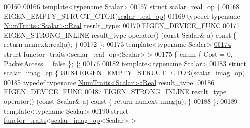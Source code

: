 \begin{DoxyCode}
00160 
00166 \textcolor{keyword}{template}<\textcolor{keyword}{typename} Scalar>
\hyperlink{struct_eigen_1_1internal_1_1scalar__real__op}{00167} \textcolor{keyword}{struct }\hyperlink{struct_eigen_1_1internal_1_1scalar__real__op}{scalar\_real\_op} \{
00168   EIGEN\_EMPTY\_STRUCT\_CTOR(\hyperlink{struct_eigen_1_1internal_1_1scalar__real__op}{scalar\_real\_op})
00169   \textcolor{keyword}{typedef} \textcolor{keyword}{typename} \hyperlink{group___core___module_struct_eigen_1_1_num_traits}{NumTraits<Scalar>::Real} result\_type;
00170   EIGEN\_DEVICE\_FUNC
00171   EIGEN\_STRONG\_INLINE result\_type operator() (\textcolor{keyword}{const} Scalar& a)\textcolor{keyword}{ const }\{ \textcolor{keywordflow}{return} numext::real(a); \}
00172 \};
00173 \textcolor{keyword}{template}<\textcolor{keyword}{typename} Scalar>
\hyperlink{struct_eigen_1_1internal_1_1functor__traits_3_01scalar__real__op_3_01_scalar_01_4_01_4}{00174} \textcolor{keyword}{struct }\hyperlink{struct_eigen_1_1internal_1_1functor__traits}{functor\_traits}<\hyperlink{struct_eigen_1_1internal_1_1scalar__real__op}{scalar\_real\_op}<Scalar> >
00175 \{ \textcolor{keyword}{enum} \{ Cost = 0, PacketAccess = \textcolor{keyword}{false} \}; \};
00176 
00182 \textcolor{keyword}{template}<\textcolor{keyword}{typename} Scalar>
\hyperlink{struct_eigen_1_1internal_1_1scalar__imag__op}{00183} \textcolor{keyword}{struct }\hyperlink{struct_eigen_1_1internal_1_1scalar__imag__op}{scalar\_imag\_op} \{
00184   EIGEN\_EMPTY\_STRUCT\_CTOR(\hyperlink{struct_eigen_1_1internal_1_1scalar__imag__op}{scalar\_imag\_op})
00185   \textcolor{keyword}{typedef} \textcolor{keyword}{typename} \hyperlink{group___core___module_struct_eigen_1_1_num_traits}{NumTraits<Scalar>::Real} result\_type;
00186   EIGEN\_DEVICE\_FUNC
00187   EIGEN\_STRONG\_INLINE result\_type operator() (\textcolor{keyword}{const} Scalar& a)\textcolor{keyword}{ const }\{ \textcolor{keywordflow}{return} numext::imag(a); \}
00188 \};
00189 \textcolor{keyword}{template}<\textcolor{keyword}{typename} Scalar>
\hyperlink{struct_eigen_1_1internal_1_1functor__traits_3_01scalar__imag__op_3_01_scalar_01_4_01_4}{00190} \textcolor{keyword}{struct }\hyperlink{struct_eigen_1_1internal_1_1functor__traits}{functor\_traits}<\hyperlink{struct_eigen_1_1internal_1_1scalar__imag__op}{scalar\_imag\_op}<Scalar> >

\end{DoxyCode}
